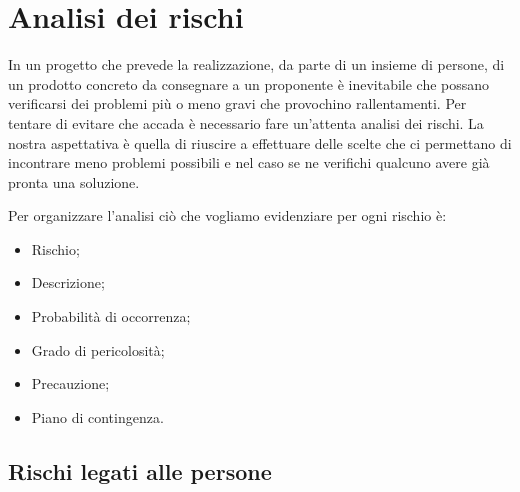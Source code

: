 \chapter{Analisi dei rischi}

In un progetto che prevede la realizzazione, da parte di un insieme di persone, di un prodotto concreto 
da consegnare a un proponente è inevitabile che possano verificarsi dei problemi più o meno gravi che
provochino rallentamenti. Per tentare di evitare che accada è necessario fare un'attenta analisi dei
rischi. La nostra aspettativa è quella di riuscire a effettuare delle scelte che ci permettano di
incontrare meno problemi possibili e nel caso se ne verifichi qualcuno avere già pronta una soluzione.

Per organizzare l'analisi ciò che vogliamo evidenziare per ogni rischio è:
\begin{itemize}
    \item Rischio;
    \item Descrizione;
    \item Probabilità di occorrenza;
    \item Grado di pericolosità;
    \item Precauzione;
    \item Piano di contingenza.
\end{itemize}

\newpage
\section{Rischi legati alle persone}

